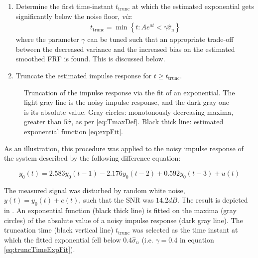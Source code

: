 \begin{enumerate}
\item
Determine the first time-instant $t_\mathrm{trunc}$ at which the estimated exponential gets significantly below the noise floor, \emph{viz}:
\begin{align}\label{eq:truncTimeExpFit}
t_\mathrm{trunc} = \min \left\{t:Ae^{at} < \gamma\hat\sigma_\mathrm{n}\right\}
\end{align}
where the parameter $\gamma$ can be tuned such that an appropriate trade-off between the decreased variance and the increased bias on the estimated smoothed FRF is found. This is discussed below. %

\item
 Truncate the estimated impulse response for $t \geqslant t_\mathrm{trunc}$.

\end{enumerate}
  
\begin{figure}[tbh] %
\centering
\setlength{}
\setlength\figureheight{0.68\figurewidth}

\caption[Impulse response truncation using exponential fit.]{Truncation of the impulse response via the fit of  an exponential. 
The light gray line is the noisy impulse response, and the dark gray one is its absolute value. 
Gray circles: monotonously decreasing maxima, greater than $5\hat\sigma$, as per \eqref{eq:TmaxDef}. 
Black thick line: estimated exponential function \eqref{eq:expFit}.}
\label{FRF_truncate_expfitter}
\end{figure}

As an illustration, this procedure was applied to the noisy impulse response of the system described by the following difference equation:

\begin{equation}
y_0(t) = 2.583y_0(t - 1) -2.176y_0(t - 2)+0.592y_0(t-3) + u(t)
\end{equation}

The measured signal was disturbed by random white noise, $y(t) = y_0(t) + e(t)$, such that the \gls{SNR} was $14.2\unit{dB}$.
The result is depicted in . An exponential function (black thick line) is fitted on the maxima (gray circles) of the absolute value of a noisy impulse response (dark gray line). The truncation time (black vertical line) $t_\mathrm{trunc}$ was selected as the time instant at which the fitted exponential fell below $0.4\hat\sigma_n$ (i.e. $\gamma = 0.4$ in equation \eqref{eq:truncTimeExpFit}).

